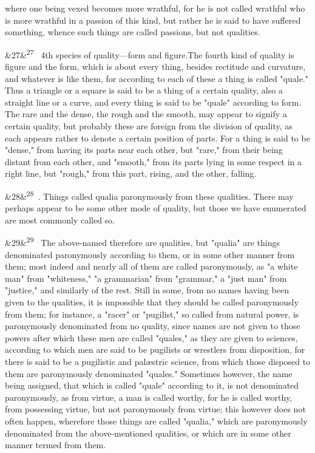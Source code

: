 \documentclass[12pt]{article}
\newcommand{\para}[1][]{\par\noindent\ifx&#1&\else\textsuperscript{\footnotesize #1}~\fi}
\begin{document}
where one being vexed becomes more wrathful, for he is not called wrathful who is more wrathful in a passion of this kind, but rather he is said to have suffered something, whence such things are called passions, but not qualities.

\para[27] 4th species of quality---form and figure.The fourth kind of quality is figure and the form, which is about every thing, besides rectitude and curvature, and whatever is like them, for according to each of these a thing is called "quale." Thus a triangle or a square is said to be a thing of a certain quality, also a straight line or a curve, and every thing is said to be "quale" according to form. The rare and the dense, the rough and the smooth, may appear to signify a certain quality, but probably these are foreign from the division of quality, as each appears rather to denote a certain position of parts. For a thing is said to be "dense," from having its parts near each other, but "rare," from their being distant from each other, and "smooth," from its parts lying in some respect in a right line, but "rough," from this part, rising, and the other, falling.

\para[28] 5. Things called qualia paronymously from these qualities. There may perhaps appear to be some other mode of quality, but those we have enumerated are most commonly called so.

\para[29] The above-named therefore are qualities, but "qualia" are things denominated paronymously according to them, or in some other manner from them; most indeed and nearly all of them are called paronymously, as "a white man" from "whiteness," "a grammarian" from "grammar," a "just man" from "justice," and similarly of the rest. Still in some, from no names having been given to the qualities, it is impossible that they should be called paronymously from them; for instance, a "racer" or "pugilist," so called from natural power, is paronymously denominated from no quality, since names are not given to those powers after which these men are called "quales," as they are given to sciences, according to which men are said to be pugilists or wrestlers from disposition, for there is said to be a pugilistic and palæstric science, from which those disposed to them are paronymously denominated "quales." Sometimes however, the name being assigned, that which is called "quale" according to it, is not denominated paronymously, as from virtue, a man is called worthy, for he is called worthy, from possessing virtue, but not paronymously from virtue; this however does not often happen, wherefore those things are called "qualia," which are paronymously denominated from the above-mentioned qualities, or which are in some other manner termed from them.
\end{document}
